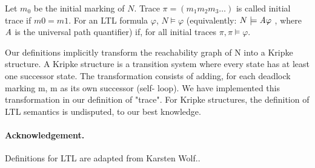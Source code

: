 \documentclass{llncs}
\begin{document}
Let $m_0$ be the initial marking of $N$.
Trace $\pi = (m_1 m_2 m_3 \ldots)$ is called initial trace if $m0 = m1$.
For an LTL formula $\varphi$, $N \models \varphi$ (equivalently: $N \models \mathit{A} \varphi$ , where $\mathit{A}$ is the
universal path quantifier) if, for all initial traces $\pi, \pi \models \varphi$.



Our definitions implicitly transform the reachability graph of N into a
Kripke structure. A Kripke structure is a transition system where every
state has at least one successor state. The transformation consists of
adding, for each deadlock marking m, m as its own successor (self-
loop). We have implemented this transformation in our definition of
"trace". For Kripke structures, the definition of LTL semantics is
undisputed, to our best knowledge.

\paragraph{Acknowledgement.} Definitions for LTL are adapted from Karsten Wolf..




\end{document}
